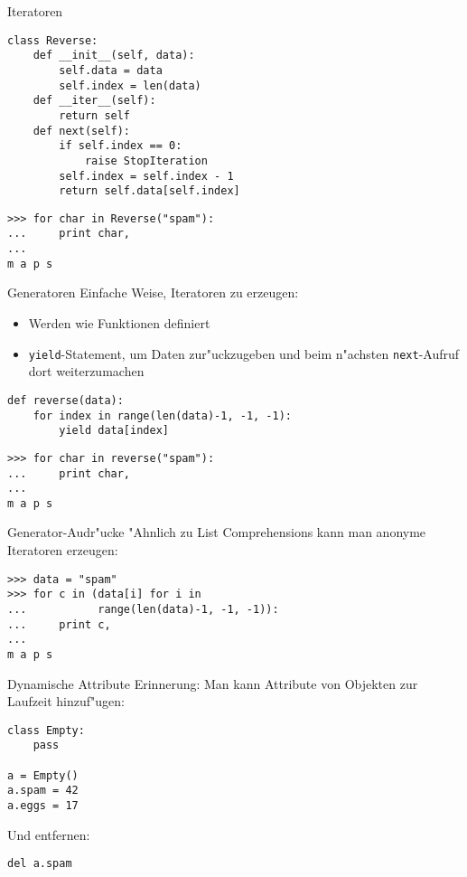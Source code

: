 \begin{frame}[fragile]{Iteratoren}
\begin{lstlisting}[style=Python]
class Reverse:
    def __init__(self, data):
        self.data = data
        self.index = len(data)
    def __iter__(self):
        return self
    def next(self):
        if self.index == 0:
            raise StopIteration
        self.index = self.index - 1
        return self.data[self.index]
\end{lstlisting}
\begin{lstlisting}[style=Shell]
>>> for char in Reverse("spam"):
...     print char,
...
m a p s
\end{lstlisting}
\end{frame}

\begin{frame}[fragile]{Generatoren}
Einfache Weise, Iteratoren zu erzeugen:
\begin{itemize}
\item Werden wie Funktionen definiert
\item \lstinline{yield}-Statement, um Daten zur"uckzugeben und beim n"achsten \lstinline{next}-Aufruf dort weiterzumachen
\end{itemize}
\begin{lstlisting}[style=Python]
def reverse(data):
    for index in range(len(data)-1, -1, -1):
        yield data[index]
\end{lstlisting}
\begin{lstlisting}[style=Shell]
>>> for char in reverse("spam"):
...     print char,
...
m a p s
\end{lstlisting}
\end{frame}

\begin{frame}[fragile]{Generator-Audr"ucke}
"Ahnlich zu List Comprehensions kann man anonyme Iteratoren erzeugen:
\begin{lstlisting}[style=Shell]
>>> data = "spam"
>>> for c in (data[i] for i in
...           range(len(data)-1, -1, -1)):
...     print c,
...
m a p s
\end{lstlisting}
\end{frame}


\begin{frame}[fragile]{Dynamische Attribute}
Erinnerung: Man kann Attribute von Objekten zur Laufzeit hinzuf"ugen:
\begin{lstlisting}
class Empty:
    pass

a = Empty()
a.spam = 42
a.eggs = 17
\end{lstlisting}
\vspace{2mm}
Und entfernen:
\begin{lstlisting}
del a.spam
\end{lstlisting}
\end{frame}


